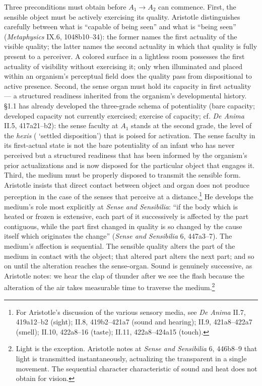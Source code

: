 Three preconditions must obtain before $A_1 \rightarrow A_2$ can commence. First, the sensible object must be actively exercising its quality. Aristotle distinguishes carefully between what is ``capable of being seen'' and what is ``being seen'' (\textit{Metaphysics} IX.6, 1048b10--34): the former names the first actuality of the visible quality; the latter names the second actuality in which that quality is fully present to a perceiver. A colored surface in a lightless room possesses the first actuality of visibility without exercising it; only when illuminated and placed within an organism's perceptual field does the quality pass from dispositional to active presence. Second, the sense organ must hold its capacity in first actuality --- a structured readiness inherited from the organism's developmental history. §1.1 has already developed the three-grade schema of potentiality (bare capacity; developed capacity not currently exercised; exercise of capacity; cf. \textit{De Anima} II.5, 417a21--b2): the sense faculty at $A_1$ stands at the second grade, the level of the \textit{hexis} ( `settled disposition') that is poised for activation. The sense faculty in its first-actual state is not the bare potentiality of an infant who has never perceived but a structured readiness that has been informed by the organism's prior actualizations and is now disposed for the particular object that engages it. Third, the medium must be properly disposed to transmit the sensible form. Aristotle insists that direct contact between object and organ does not produce perception in the case of the senses that perceive at a distance.\footnote{For Aristotle's discussion of the various sensory media, see \textit{De Anima} II.7, 419a12--b2 (sight); II.8, 419b2--421a7 (sound and hearing); II.9, 421a8--422a7 (smell); II.10, 422a8--16 (taste); II.11, 422a8--424a15 (touch).} He develops the medium's role most explicitly at \textit{Sense and Sensibilia}: ``if the body which is heated or frozen is extensive, each part of it successively is affected by the part contiguous, while the part first changed in quality is so changed by the cause itself which originates the change'' (\textit{Sense and Sensibilia} 6, 447a3--7). The medium's affection is sequential. The sensible quality alters the part of the medium in contact with the object; that altered part alters the next part; and so on until the alteration reaches the sense-organ. Sound is genuinely successive, as Aristotle notes: we hear the clap of thunder after we see the flash because the alteration of the air takes measurable time to traverse the medium.\footnote{Light is the exception. Aristotle notes at \textit{Sense and Sensibilia} 6, 446b8--9 that light is transmitted instantaneously, actualizing the transparent in a single movement. The sequential character characteristic of sound and heat does not obtain for vision.}

